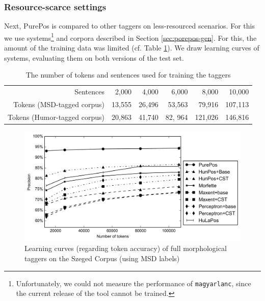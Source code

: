 \subsubsection{Resource-scarce settings}

Next, PurePos is compared to other taggers on less-resourced scenarios.
For this we use systems\footnote{Unfortunately, we could not measure the performance of \texttt{magyarlanc}, since the current release of the tool cannot be trained.}  and corpora described in Section \ref{sec:porepos-gen}.
For this, the amount of the training data was limited (cf. Table \ref{tab:small-szeged}).
We draw learning curves of systems, evaluating them on both versions of the test set.

\begin{table}[H]
\centering
\caption{The number of tokens and sentences used for training the taggers}
\label{tab:small-szeged}
\begin{tabular}{ r | r r r r r}
Sentences & 2,000 & 4,000 & 6,000 & 8,000 & 10,000 \\
Tokens (MSD-tagged corpus) & 13,555 & 26,496 & 53,563 & 79,916 & 107,113 \\
Tokens (Humor-tagged corpus) & 20,863 & 41,740 & 82, 964 & 121,026 & 146,816 \\
\end{tabular}
\end{table}


\begin{figure}[H]
  \centering
  \includegraphics[width=1\textwidth]{MorphTagging/msd_token.png} 
  \caption{Learning curves (regarding token accuracy) of full morphological taggers on the Szeged Corpus (using MSD labels)}
  \label{fig:msd-token}
\end{figure}

